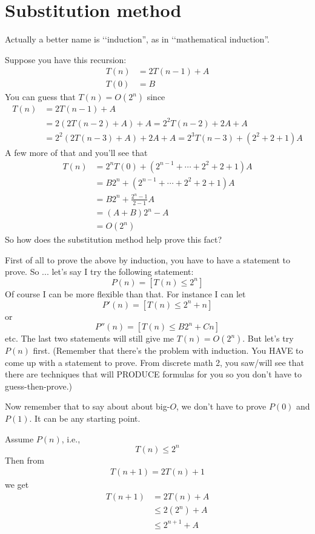 \section{Substitution method}

Actually a better name is \lq\lq induction'', as in \lq\lq mathematical
induction''.

Suppose you have this recursion:
\begin{align*}
T(n) &= 2 T(n-1) + A \\
T(0) &= B
\end{align*}
You can guess that $T(n) = O(2^n)$
since
\begin{align*}
T(n)
&= 2 T(n-1) + A \\
&= 2 (2T(n-2) + A) + A = 2^2 T(n-2) + 2A + A\\
&= 2^2(2T(n-3) + A) + 2A + A = 2^3T(n-3) + (2^2 + 2 + 1)A 
\end{align*}
A few more of that and you'll see that
\begin{align*}
T(n)
&= 2^n T(0) + (2^{n-1} + \cdots + 2^2 + 2 + 1) A \\
&= B 2^n  + (2^{n-1} + \cdots + 2^2 + 2 + 1) A \\
&= B 2^n  + \frac{2^n - 1}{2 - 1} A \\
&= (A + B) 2^n  - A \\
&= O(2^n)
\end{align*}
So how does the substitution method help prove this fact?

First of all to prove the above by induction, you have
to have a statement to prove.
So ... let's say I try the following statement:
\[
P(n) = [T(n) \leq 2^n]
\]
Of course I can be more flexible than that.
For instance I can let
\[
P'(n) = [T(n) \leq 2^n + n]
\]
or
\[
P''(n) = [T(n) \leq B 2^n + Cn]
\]
etc.
The last two statements will still give me $T(n) = O(2^n)$.
But let's try $P(n)$ first.
(Remember that there's the problem with induction.
You HAVE to come up with a statement to prove.
From discrete math 2, you saw/will see that there are
techniques that will PRODUCE formulas for you so you
don't have to guess-then-prove.)

Now remember that to say about about big-$O$, we don't have to
prove $P(0)$ and $P(1)$.
It can be any starting point.

Assume $P(n)$, i.e.,
\[
T(n) \leq 2^n
\]
Then from
\begin{align*}
 T(n + 1) = 2T(n) + 1 
\end{align*}
we get
\begin{align*}
T(n + 1)
&= 2T(n) + A  \\
&\leq 2(2^n) + A  \\
&\leq 2^{n+1} + A  \\
\end{align*}

